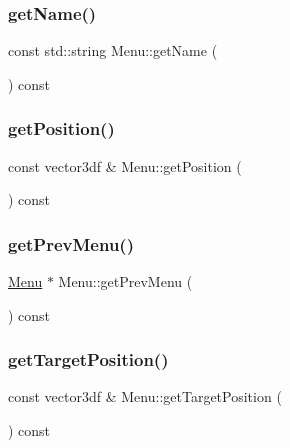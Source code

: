 \mbox{\label{class_menu_aa8de5fb849c062542a390bd1a6494602}} 
\subsubsection{\texorpdfstring{getName()}{getName()}}
{\footnotesize\ttfamily const std\+::string Menu\+::get\+Name (\begin{DoxyParamCaption}{ }\end{DoxyParamCaption}) const}

\mbox{\label{class_menu_a41ba3aaa9818176a6a956956edff67d8}} 
\subsubsection{\texorpdfstring{getPosition()}{getPosition()}}
{\footnotesize\ttfamily const vector3df \& Menu\+::get\+Position (\begin{DoxyParamCaption}{ }\end{DoxyParamCaption}) const}

\mbox{\label{class_menu_a35cba1773e1c1df44ac830133d461320}} 
\subsubsection{\texorpdfstring{getPrevMenu()}{getPrevMenu()}}
{\footnotesize\ttfamily \mbox{\hyperlink{class_menu}{Menu}} $\ast$ Menu\+::get\+Prev\+Menu (\begin{DoxyParamCaption}{ }\end{DoxyParamCaption}) const}

\mbox{\label{class_menu_a41bc0c154f360e94b05e6a6da8ef9ac7}} 
\subsubsection{\texorpdfstring{getTargetPosition()}{getTargetPosition()}}
{\footnotesize\ttfamily const vector3df \& Menu\+::get\+Target\+Position (\begin{DoxyParamCaption}{ }\end{DoxyParamCaption}) const}

